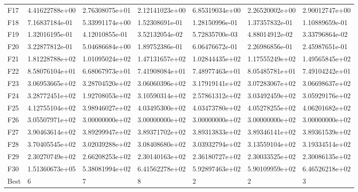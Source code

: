 \begin{tabular}{lllllll}
F17  &  4.41622788e+00 &  2.76308075e+01 &  2.12141023e+00 &  6.85319034e+00 &  2.26520002e+00 &  2.90012747e+00 \\
F18  &  7.16837184e-01 &  5.33991174e+00 &  1.52308691e-01 &  1.28150996e-01 &  1.37357832e-01 &  1.10889659e-01 \\
F19  &  1.32016195e-01 &  4.12010855e-01 &  3.52132054e-02 &  5.72835700e-03 &  4.88014912e-02 &  3.33796864e-02 \\
F20  &  3.22877812e-01 &  5.04686684e+00 &  1.89752386e-01 &  6.06476672e-01 &  2.26986856e-01 &  2.45987651e-01 \\
F21  &  1.81228788e+02 &  1.01095024e+02 &  1.47131657e+02 &  1.02844435e+02 &  1.17555249e+02 &  1.49565845e+02 \\
F22  &  8.58076104e+01 &  6.68067973e+01 &  7.41908084e+01 &  7.48977463e+01 &  8.05485781e+01 &  7.49104242e+01 \\
F23  &  3.06953665e+02 &  3.28704520e+02 &  3.06060396e+02 &  3.17919141e+02 &  3.07283067e+02 &  3.06698637e+02 \\
F24  &  3.28772451e+02 &  1.92708053e+02 &  3.10590314e+02 &  2.57861312e+02 &  3.03492459e+02 &  3.05929176e+02 \\
F25  &  4.12755104e+02 &  3.98946027e+02 &  4.03495300e+02 &  4.03473780e+02 &  4.05278255e+02 &  4.06201682e+02 \\
F26  &  3.05507971e+02 &  3.00000000e+02 &  3.00000000e+02 &  3.00000000e+02 &  3.00000000e+02 &  3.00000000e+02 \\
F27  &  3.90463614e+02 &  3.89299947e+02 &  3.89371702e+02 &  3.89313833e+02 &  3.89346141e+02 &  3.89361539e+02 \\
F28  &  3.70405545e+02 &  3.02039288e+02 &  3.08408680e+02 &  3.03932794e+02 &  3.13559104e+02 &  3.19334514e+02 \\
F29  &  2.30270749e+02 &  2.66208253e+02 &  2.30140163e+02 &  2.36180727e+02 &  2.30033525e+02 &  2.30086135e+02 \\
F30  &  1.51360673e+05 &  5.38081994e+02 &  6.41562278e+02 &  5.92897463e+02 &  5.90109959e+02 &  6.46526218e+02 \\
Best &               6 &               7 &               8 &               2 &               2 &               3 \\
\bottomrule
\end{tabular}
